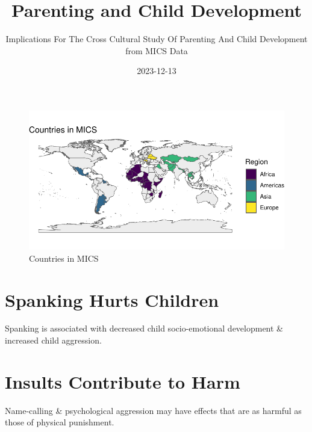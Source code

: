 \documentclass[
  letterpaper,
  DIV=11,
  numbers=noendperiod]{scrartcl}
\title{Parenting and Child Development}
\subtitle{Implications For The Cross Cultural Study Of Parenting And
Child Development from MICS Data}
\author{}
\date{2023-12-13}
\makeatletter
\renewcommand{\maketitle}{\bgroup\setlength{\parindent}{0pt}
\begin{flushleft}
  {\sffamily\huge\textbf{\MakeUppercase{\@title}}} \vspace{0.3cm} \newline
  {\Large {\@subtitle}} \newline
  \@author
\end{flushleft}\egroup
}
\makeatother
\begin{document}
\maketitle
\pagestyle{mystyle}

\ifdefined\Shaded\renewenvironment{Shaded}{\begin{tcolorbox}[breakable, borderline west={3pt}{0pt}{shadecolor}, colback={codebgcolor}, boxrule=0pt, sharp corners, enhanced, frame hidden]}{\end{tcolorbox}}\fi

\begin{figure}[H]

{\centering \includegraphics{MICS-infographic_files/figure-pdf/fig-MICS-1.pdf}

}

\caption{\label{fig-MICS}Countries in MICS}

\end{figure}

\hypertarget{spanking-hurts-children}{%
\section{Spanking Hurts Children}\label{spanking-hurts-children}}

Spanking is associated with decreased child socio-emotional development
\& increased child aggression.

\hypertarget{insults-contribute-to-harm}{%
\section{Insults Contribute to Harm}\label{insults-contribute-to-harm}}

Name-calling \& psychological aggression may have effects that are as
harmful as those of physical punishment.
\end{document}
